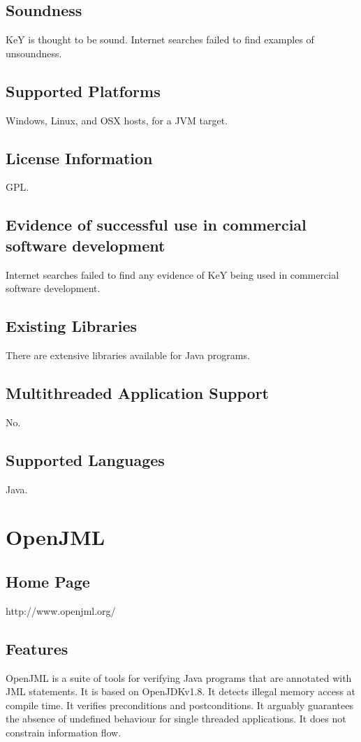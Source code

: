 \documentclass[12pt,openany,a4paper]{book}
\begin{document}
	\subsection{Soundness} 
		KeY is thought to be sound. Internet searches failed to find examples of unsoundness.
	\subsection{Supported Platforms} 
		Windows, Linux, and OSX hosts, for a JVM target.
	\subsection{License Information} 
		GPL.		
	\subsection{Evidence of successful use in commercial software development} 
		Internet searches failed to find any evidence of KeY being used in commercial software development. 
	\subsection{Existing Libraries} 
		There are extensive libraries available for Java programs.
	\subsection{Multithreaded Application Support} 
		No.
	\subsection{Supported Languages} 
		Java.	










\section{OpenJML}
	\subsection{Home Page}%
	http://www.openjml.org/
	\subsection{Features}
	OpenJML is a suite of tools for verifying Java programs that are annotated with JML statements. It is based on OpenJDKv1.8. It detects illegal memory access at compile time. It verifies preconditions and postconditions. It arguably guarantees the absence of undefined behaviour for single threaded applications. It does not constrain information flow.
	
\end{document}
